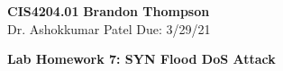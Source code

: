 \noindent
\textbf{CIS4204.01} \hfill \textbf{Brandon Thompson} \\
\normalsize Dr. Ashokkumar Patel \hfill Due: 3/29/21\\

\begin{center}
\textbf{Lab Homework 7: SYN Flood DoS Attack}
\end{center}
